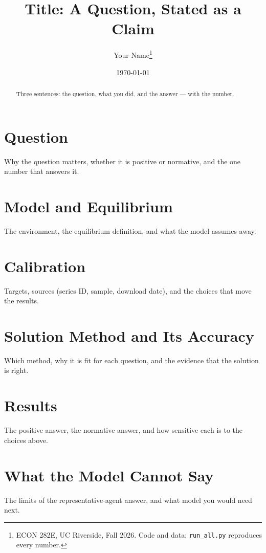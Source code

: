 \documentclass[11pt]{article}
\title{Title: A Question, Stated as a Claim}
\author{Your Name\thanks{ECON 282E, UC Riverside, Fall 2026. Code and data: \texttt{run\_all.py} reproduces every number.}}
\date{\today}
\begin{document}
\maketitle

\begin{abstract}
Three sentences: the question, what you did, and the answer --- with the number.
\end{abstract}

\section{Question}
Why the question matters, whether it is positive or normative, and the one number that answers it.

\section{Model and Equilibrium}
The environment, the equilibrium definition, and what the model assumes away.

\section{Calibration}
% 
Targets, sources (series ID, sample, download date), and the choices that move the results.

\section{Solution Method and Its Accuracy}
% 
Which method, why it is fit for each question, and the evidence that the solution is right.

\section{Results}
% 
The positive answer, the normative answer, and how sensitive each is to the choices above.

\section{What the Model Cannot Say}
The limits of the representative-agent answer, and what model you would need next.


% 
\end{document}
